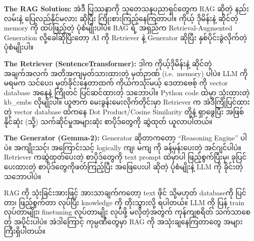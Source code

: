 \documentclass[11pt]{article}
\begin{document}
\textbf{The RAG Solution:} {\burmesefont အဲဒီ} {\burmesefont ပြဿနာကို} {\burmesefont သုတေသနပညာရှင်တွေက} RAG {\burmesefont ဆိုတဲ့} {\burmesefont နည်းလမ်းနဲ့}
{\burmesefont ပြေလည်နိုင်မလား} {\burmesefont ဆိုပြီး} {\burmesefont ကြိုးစားကြည့်နေကြတာပါ။} {\burmesefont ကိုယ့်} {\burmesefont ဒိုမိန်းနဲ့} {\burmesefont ဆိုင်တဲ့} memory {\burmesefont ကို} {\burmesefont ထပ်ဖြည့်တဲ့}
{\burmesefont ပုံစံမျိုးပါပဲ။} RAG {\burmesefont ရဲ့} {\burmesefont အရှည်က} Retrieval-Augmented Generation {\burmesefont လို့ခေါ်ဆိုပြီးတော့} AI {\burmesefont ကို}
Retriever {\burmesefont နဲ့} Generator {\burmesefont ဆိုပြီး} {\burmesefont နှစ်ပိုင်းခွဲလိုက်တဲ့} {\burmesefont ပုံစံမျိုးပါ။}

\textbf{The Retriever (SentenceTransformer):} {\burmesefont ဒါက} {\burmesefont ကိုယ့်ဒိုမိန်းနဲ့} {\burmesefont ဆိုင်တဲ့} {\burmesefont အချက်အလက်}
{\burmesefont အတိအကျမှတ်သားထားတဲ့} {\burmesefont မှတ်ဉာဏ်} (i.e.~memory) {\burmesefont ပါပဲ။} LLM {\burmesefont ကို} {\burmesefont မရမက} {\burmesefont သင်ပေး၊} {\burmesefont မှတ်ခိုင်းနေတာထက်}
{\burmesefont ကိုယ်ကသုံးမယ့်} {\burmesefont ဒေတာဗေစ့်} {\burmesefont ကို} vector database {\burmesefont အနေနဲ့} {\burmesefont ကြိုတင်} {\burmesefont ပြင်ဆင်ထားတဲ့} {\burmesefont သဘောပါ။} Python
code {\burmesefont ထဲမှာ} {\burmesefont သုံးထားတဲ့} kb\_embs {\burmesefont လိုမျိုးပါ။} {\burmesefont ယူဇာက} {\burmesefont မေးခွန်းမေးလိုက်တိုင်းမှာ} Retriever {\burmesefont က}
{\burmesefont အဲဒီကြိုပြင်ထားတဲ့} vector database {\burmesefont ထဲကနေ} Dot Product/Cosine Similarity {\burmesefont တို့နဲ့}
{\burmesefont ရှာဖွေပြီး} {\burmesefont အဖြစ်နိုင်ဆုံး} ({\burmesefont သို့}) {\burmesefont သက်ဆိုင်မှုအများဆုံး} {\burmesefont စာပိုဒ်တွေကို} {\burmesefont ဆွဲထုတ်} {\burmesefont ယူလာပါတယ်။}

\textbf{The Generator (Gemma-2):} Generator {\burmesefont ဆိုတာကတော့} ``Reasoning Engine''
{\burmesefont ပါပဲ။} {\burmesefont အကျိုးသင့်၊} {\burmesefont အကြောင်းသင့်} logically {\burmesefont ကျ၊} {\burmesefont မကျ} {\burmesefont ကို} {\burmesefont ခန့်မှန်းပေးတဲ့} {\burmesefont အင်ဂျင်ပါပဲ။} Retriever
{\burmesefont ကဆွဲထုတ်ပေးတဲ့} {\burmesefont စာပိုဒ်တွေကို} text prompt {\burmesefont ထဲမှာပါ} {\burmesefont ဖြည့်စွက်ပြီးမှ၊} {\burmesefont ခုပြင်ပေးထားတဲ့}
{\burmesefont စာပိုဒ်တွေကိုဖတ်ကြည့်ပြီး} {\burmesefont အဖြေပေးပါ} {\burmesefont ဆိုတဲ့} {\burmesefont ပုံစံမျိုးနဲ့} LLM {\burmesefont ကို} {\burmesefont ခိုင်းတဲ့} {\burmesefont သဘောပါပဲ။}

RAG {\burmesefont ကို} {\burmesefont သုံးခြင်းအားဖြင့်} {\burmesefont အားသာချက်ကတော့} text {\burmesefont ဖိုင်} {\burmesefont သို့မဟုတ်} database{\burmesefont ကို} {\burmesefont ပြင်တာ၊} {\burmesefont ဖြည့်စွက်တာ}
{\burmesefont လုပ်ပြီး} knowledge {\burmesefont ကို} {\burmesefont တိုးသွားလို့} {\burmesefont ရပါတယ်။} LLM {\burmesefont ကို} {\burmesefont ပြန်} train {\burmesefont လုပ်တာမျိုး၊} finetuning
{\burmesefont လုပ်တာမျိုး} {\burmesefont လုပ်ဖို့} {\burmesefont မလိုတဲ့အတွက်} {\burmesefont ကုန်ကျစရိတ်} {\burmesefont သက်သာစေတဲ့} {\burmesefont အပိုင်းပါပဲ။} {\burmesefont အဲဒါကြောင့်} {\burmesefont ကုမ္ပဏီတွေမှာ} RAG {\burmesefont ကို}
{\burmesefont အသုံးချနေကြတာတွေ} {\burmesefont အများကြီးရှိပါတယ်။}
\end{document}

